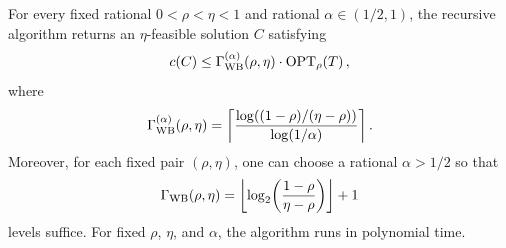 \iffalse
\begin{theorem}\label{thm:tree-weighted-budget-recursive}
    For every fixed rational $0<\rho<\eta<1$ and rational $\alpha\in(1/2,1)$, the recursive algorithm returns an $\eta$-feasible solution $C$ satisfying
    \[
        c\mathopen{}\left( C \right)\leq\Gamma_{\mathrm{WB}}^{(\alpha)}(\rho,\eta)\cdot\textup{OPT}_{\rho}\mathopen{}\left( T \right),
    \]
    where
    \begin{equation}\label{eq:tree-recursion-depth}
        \Gamma_{\mathrm{WB}}^{(\alpha)}(\rho,\eta)
        =\left\lceil
            \frac{
                \log\mathopen{}\left( (1-\rho)/(\eta-\rho) \right)
            }{
                \log\mathopen{}\left( 1/\alpha \right)
            }
        \right\rceil.
    \end{equation}
    Moreover, for each fixed pair $(\rho,\eta)$, one can choose a rational $\alpha>1/2$ so that
    \begin{equation}\label{eq:tree-recursion-best-depth}
        \Gamma_{\mathrm{WB}}(\rho,\eta)
        =\left\lfloor
            \log_2\mathopen{}\left( \frac{1-\rho}{\eta-\rho} \right)
          \right\rfloor+1
    \end{equation}
    levels suffice. For fixed $\rho$, $\eta$, and $\alpha$, the algorithm runs in polynomial time.
\end{theorem}
